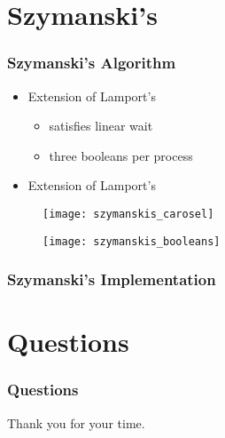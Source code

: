 \documentclass[t, pdftex]{beamer}
\begin{document}
\section{Szymanski's}
\begin{frame}[c]
    \frametitle{Szymanski's Algorithm}
    \begin{itemize}
      \item Extension of Lamport's
        \begin{itemize}
          \item satisfies linear wait
          \item three booleans per process
        \end{itemize}
      \item Extension of Lamport's
    \end{itemize}
  \begin{figure}
    \centering
    \begin{minipage}{.5\textwidth}
      \centering
      \texttt{[image: szymanskis\_carosel]}
      \label{fig:szymanskis_carosel}
    \end{minipage}%
    \begin{minipage}{.5\textwidth}
      \centering
      \texttt{[image: szymanskis\_booleans]}
      \label{fig:szymanskis_booleans}
    \end{minipage}
  \end{figure}
\end{frame}

\begin{frame}
  \frametitle{Szymanski's Implementation}
  \begin{multicols*}{3}
    
  \end{multicols*}
\end{frame}


\section{Questions}
\begin{frame}[c]
    \frametitle{Questions}  %
    Thank you for your time.
\end{frame}


\end{document}
